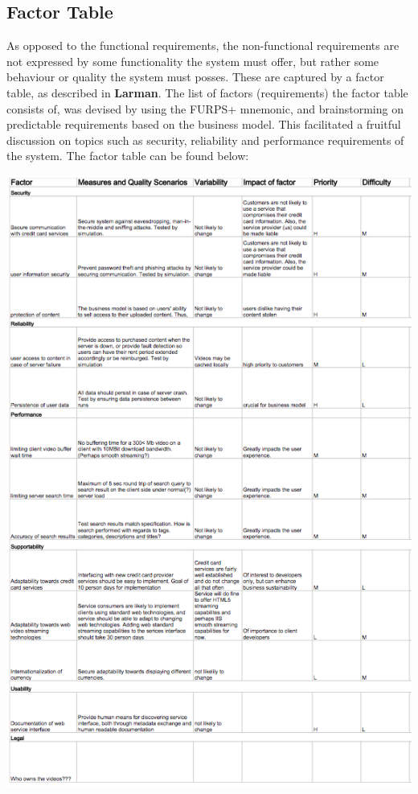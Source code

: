 \subsection{Factor Table}
As opposed to the functional requirements, the non-functional requirements are not expressed by some functionality the system must offer, but rather some behaviour or quality the system must posses. These are captured by a factor table, as described in \textbf{Larman}. The list of factors (requirements) the factor table consists of, was devised by using the FURPS+ mnemonic, and brainstorming on predictable requirements based on the business model. This facilitated a fruitful discussion on topics such as security, reliability and performance requirements of the system. The factor table can be found below:
\begin{center}
\includegraphics[scale=1.3]{FactorTable.png}
\end{center}


